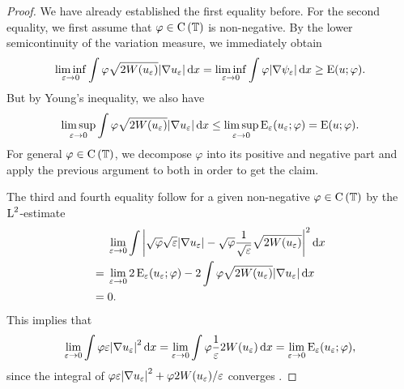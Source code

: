 \begin{proof}
	We have already established the first equality before. For the second 
	equality, we first assume that $ \varphi \in \operatorname{C} \left( \operatorname{\mathbb{T}}  
	\right) $ is non-negative.
	By the lower semicontinuity of the variation measure, we immediately obtain
	\begin{equation*}
		\liminf_{ \varepsilon \to 0 }
		\int
		\varphi
		\sqrt{ 2 W ( u_{ \varepsilon } ) }
		\abs{ \nabla u_{ \varepsilon } }
		\dd{ x }
		=
		\liminf_{ \varepsilon \to 0 }
		\int
		\varphi
		\abs{ \nabla \psi_{ \varepsilon } }
		\dd{ x }
		\geq
		\operatorname{E} ( u ; \varphi ).
	\end{equation*}
	But by Young's inequality, we also have 
	\begin{equation*}
		\limsup_{ \varepsilon \to 0 }
		\int
		\varphi
		\sqrt{ 2 W ( u_{ \varepsilon } ) }
		\abs{ \nabla u_{ \varepsilon } }
		\dd{ x }
		\leq
		\limsup_{ \varepsilon \to 0 }
		\operatorname{E}_{ \varepsilon } ( u_{ \varepsilon } ; \varphi )
		= \operatorname{E} ( u ; \varphi ).
	\end{equation*}
	For general $ \varphi \in \operatorname{C} \left( \operatorname{\mathbb{T}} \right) $, we decompose $ 
	\varphi $ into its positive and negative part and apply the previous 
	argument to both in order to get the claim.
	
	The third and fourth equality follow for a given non-negative $ \varphi 
	\in \operatorname{C} \left( \operatorname{\mathbb{T}} \right) $ by the 
	$ \operatorname{L}^{ 2 } $-estimate
	\begin{align*}
		& \lim_{ \varepsilon \to 0 }
		\int
		\abs{ \sqrt{ \varphi } \sqrt{ \varepsilon } \abs{ \nabla u_{ 
					\varepsilon } } - \sqrt{ \varphi } \frac{ 1 }{ \sqrt{ 
					\varepsilon } } 
			\sqrt{ 2 W ( u_{ \varepsilon } ) } }^{ 2 }
		\dd{ x }
		\\
		={} &
		\lim_{ \varepsilon \to 0 }
		2 \operatorname{E}_{ \varepsilon } ( u_{ \varepsilon } ; \varphi )
		-
		2 \int	
		\varphi
		\sqrt{ 2 W ( u_{ \varepsilon } ) }
		\abs{ \nabla u_{ \varepsilon } }
		\dd{ x }
		\\
		={} &
		0.
	\end{align*}
	This implies that 
	\begin{equation*}
		\lim_{ \varepsilon \to 0 }
		\int
		\varphi
		\varepsilon
		\abs{ \nabla u_{ \varepsilon } }^{ 2 }
		\dd{ x }
		=
		\lim_{ \varepsilon \to 0}
		\int
		\varphi
		\frac{ 1 }{ \varepsilon }
		2 W ( u_{ \varepsilon } )
		\dd{ x }
		=
		\lim_{ \varepsilon \to 0 }
		\operatorname{E}_{ \varepsilon } ( u_{ \varepsilon } ; \varphi ),
	\end{equation*}
	since the integral of $ 
	\varphi \varepsilon \abs{ \nabla u_{\varepsilon } }^{ 2 } + \varphi 2 W ( 
	u_{ \varepsilon } ) / \varepsilon $ converges .
\end{proof}

